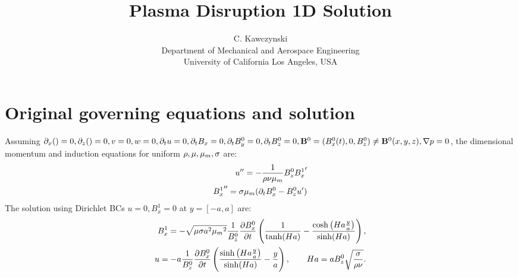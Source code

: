 \documentclass[11pt]{article}
\begin{document}
\doublespacing
\title{Plasma Disruption 1D Solution}
\author{C. Kawczynski \\
Department of Mechanical and Aerospace Engineering \\
University of California Los Angeles, USA\\
}
\maketitle

\section{Original governing equations and solution}
Assuming $\partial_x () =0, \partial_z () = 0, v=0,w=0, \partial_t u = 0, \partial_t B_x = 0,\partial_t B_y^0 = 0, \partial_t B_z^0 = 0,\mathbf{B}^0 = (B_x^0(t),0,B_z^0) \ne \mathbf{B}^0(x,y,z), \nabla p =0$, the dimensional momentum and induction equations for uniform $\rho,\mu,{\mu_m},\sigma$ are:
\begin{equation}\begin{aligned}
u''   = - \frac{1}{\rho \nu {\mu_m}} B_z^0 {B_x^1}' \\
{B_x^1}'' = \sigma {\mu_m} (\partial_t B_x^0 - B_z^0 u') \\
\end{aligned} \end{equation}
\noindent
The solution using Dirichlet BCs $u=0,B_x^1 = 0$ at $y=[-a,a]$ are:
\begin{equation}\begin{aligned}
B_x^1 = - \sqrt{\mu \sigma a^2 {\mu_m}^2} \frac{1}{B_z^0} \frac{\partial B_x^0}{\partial t} \left( \frac{1}{\tanh(Ha)} -  \frac{\cosh \left(Ha \frac{y}{a} \right)}{\sinh(Ha)}\right), \\
u   = -a \frac{1}{B_z^0} \frac{\partial B_x^0}{\partial t} \left( \frac{\sinh\left(Ha \frac{y}{a} \right)}{\sinh(Ha)} - \frac{y}{a} \right), \qquad
Ha = a B_z^0 \sqrt{\frac{\sigma}{\rho \nu}}. \\
\end{aligned} \end{equation}
\end{document}

